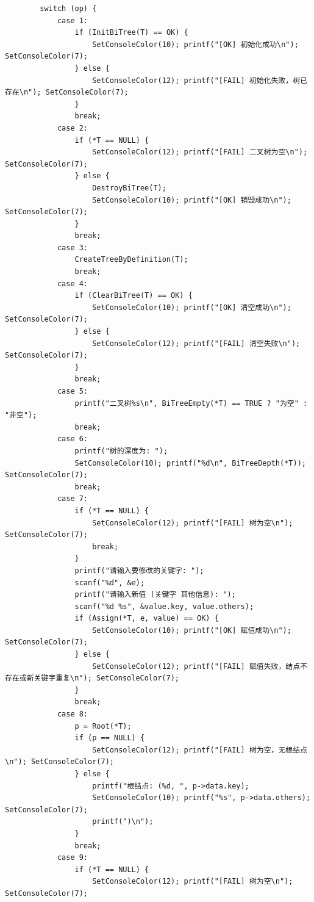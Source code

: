 \documentclass[supercite]{Experimental_Report}
\begin{document}
{\begin{lstlisting}
        switch (op) {
            case 1:
                if (InitBiTree(T) == OK) {
                    SetConsoleColor(10); printf("[OK] 初始化成功\n"); SetConsoleColor(7);
                } else {
                    SetConsoleColor(12); printf("[FAIL] 初始化失败，树已存在\n"); SetConsoleColor(7);
                }
                break;
            case 2:
                if (*T == NULL) {
                    SetConsoleColor(12); printf("[FAIL] 二叉树为空\n"); SetConsoleColor(7);
                } else {
                    DestroyBiTree(T);
                    SetConsoleColor(10); printf("[OK] 销毁成功\n"); SetConsoleColor(7);
                }
                break;
            case 3:
                CreateTreeByDefinition(T);
                break;
            case 4:
                if (ClearBiTree(T) == OK) {
                    SetConsoleColor(10); printf("[OK] 清空成功\n"); SetConsoleColor(7);
                } else {
                    SetConsoleColor(12); printf("[FAIL] 清空失败\n"); SetConsoleColor(7);
                }
                break;
            case 5:
                printf("二叉树%s\n", BiTreeEmpty(*T) == TRUE ? "为空" : "非空");
                break;
            case 6:
                printf("树的深度为: ");
                SetConsoleColor(10); printf("%d\n", BiTreeDepth(*T)); SetConsoleColor(7);
                break;
            case 7:
                if (*T == NULL) {
                    SetConsoleColor(12); printf("[FAIL] 树为空\n"); SetConsoleColor(7);
                    break;
                }
                printf("请输入要修改的关键字: ");
                scanf("%d", &e);
                printf("请输入新值 (关键字 其他信息): ");
                scanf("%d %s", &value.key, value.others);
                if (Assign(*T, e, value) == OK) {
                    SetConsoleColor(10); printf("[OK] 赋值成功\n"); SetConsoleColor(7);
                } else {
                    SetConsoleColor(12); printf("[FAIL] 赋值失败，结点不存在或新关键字重复\n"); SetConsoleColor(7);
                }
                break;
            case 8:
                p = Root(*T);
                if (p == NULL) {
                    SetConsoleColor(12); printf("[FAIL] 树为空，无根结点\n"); SetConsoleColor(7);
                } else {
                    printf("根结点: (%d, ", p->data.key);
                    SetConsoleColor(10); printf("%s", p->data.others); SetConsoleColor(7);
                    printf(")\n");
                }
                break;
            case 9:
                if (*T == NULL) {
                    SetConsoleColor(12); printf("[FAIL] 树为空\n"); SetConsoleColor(7);

\end{lstlisting}}
\end{document}
